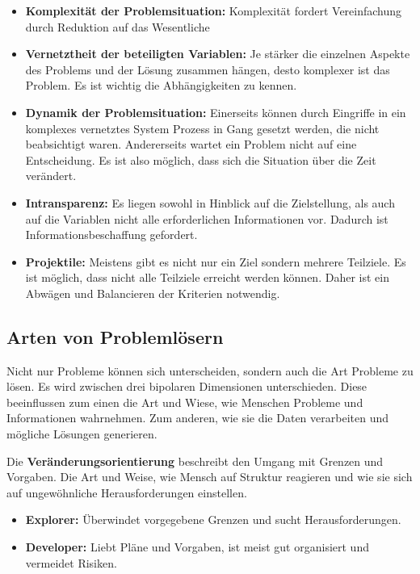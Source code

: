\begin{itemize}
\item \textbf{Komplexität der Problemsituation:} Komplexität fordert Vereinfachung durch Reduktion auf das Wesentliche 
\item \textbf{Vernetztheit der beteiligten Variablen:} Je stärker die einzelnen Aspekte des Problems und der Lösung zusammen hängen, desto komplexer ist das Problem. Es ist wichtig die Abhängigkeiten zu kennen.
\item \textbf{Dynamik der Problemsituation:} Einerseits können durch Eingriffe in ein komplexes vernetztes System Prozess in Gang gesetzt werden, die nicht beabsichtigt waren. Andererseits wartet ein Problem nicht auf eine Entscheidung. Es ist also möglich, dass sich die Situation über die Zeit verändert.
\item \textbf{Intransparenz:} Es liegen sowohl in Hinblick auf die Zielstellung, als auch auf die Variablen nicht alle erforderlichen Informationen vor. Dadurch ist Informationsbeschaffung gefordert.
\item \textbf{Projektile:} Meistens gibt es nicht nur ein Ziel sondern mehrere Teilziele. Es ist möglich, dass nicht alle Teilziele erreicht werden können. Daher ist ein Abwägen und Balancieren der Kriterien notwendig. 
\end{itemize}

\subsection{Arten von Problemlösern}
Nicht nur Probleme können sich unterscheiden, sondern auch die Art Probleme zu lösen. Es wird zwischen drei bipolaren Dimensionen unterschieden. \cite{Betsch2011} Diese beeinflussen zum einen die Art und Wiese, wie Menschen Probleme und Informationen wahrnehmen. Zum anderen, wie sie die Daten verarbeiten und mögliche Lösungen generieren.

Die \textbf{Veränderungsorientierung} beschreibt den Umgang mit Grenzen und Vorgaben. Die Art und Weise, wie Mensch auf Struktur reagieren und wie sie sich auf ungewöhnliche Herausforderungen einstellen.
	\begin{itemize}
	\item \textbf{Explorer:} Überwindet vorgegebene Grenzen und sucht Herausforderungen.
	\item \textbf{Developer:} Liebt Pläne und Vorgaben, ist meist gut organisiert und vermeidet Risiken.
	\end{itemize}

